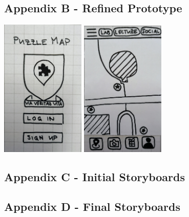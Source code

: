 \documentclass[10pt,twocolumn]{article} %
\begin{document}
\subsection*{Appendix B - Refined Prototype}
\includegraphics[width=0.3\textwidth]{./figures/refined_proto/1.jpg}
\includegraphics[width=0.3\textwidth]{./figures/refined_proto/2.jpg}

\newpage
\subsection*{Appendix C - Initial Storyboards}

\newpage
\subsection*{Appendix D - Final Storyboards}

\end{document}
